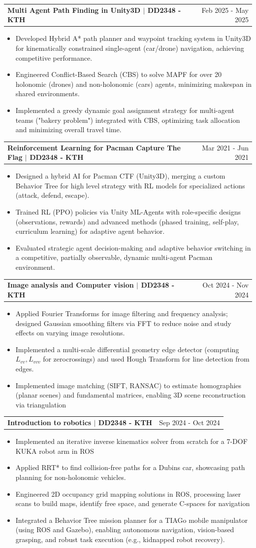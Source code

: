 \documentclass[letterpaper, 11pt]{article}
\makeatletter
\newcommand{\resumeItem}[1]{ \item\small{ {#1 \vspace{-2pt}} } }
\newcommand{\resumeProjectHeading}[2]{
\vspace{-1pt}
\item
\begin{tabular*}{1.0\textwidth}[t]{l@{\extracolsep{\fill}}r}
	\textbf{#1}  & {\small #2} \\
\end{tabular*}
\vspace{-20pt}
}
\newcommand{\resumeItemListStart}{\begin{itemize}[leftmargin=0.25in]}
\newcommand{\resumeItemListEnd}{\end{itemize}
\vspace{-5pt}}
\makeatother
\begin{document}
    
    \resumeProjectHeading{Multi Agent Path Finding in Unity3D $|$ \textnormal{\small DD2348 - KTH}}{Feb 2025 - May 2025}
    \resumeItemListStart 
        \resumeItem{Developed Hybrid A* path planner and waypoint tracking system in Unity3D for kinematically constrained single-agent (car/drone) navigation, achieving competitive performance.}
        \resumeItem{Engineered Conflict-Based Search (CBS) to solve MAPF for over 20 holonomic (drones) and non-holonomic (cars) agents, minimizing makespan in shared environments. }
        \resumeItem{Implemented a greedy dynamic goal assignment strategy for multi-agent teams ("bakery problem") integrated with CBS, optimizing task allocation and minimizing overall travel time. }
    \resumeItemListEnd

    \newpage 
    \resumeProjectHeading{Reinforcement Learning for Pacman Capture The Flag $|$ \textnormal{\small DD2348 - KTH}}{Mar 2021 - Jun 2021}
    \resumeItemListStart 
        \resumeItem{Designed a hybrid AI for Pacman CTF (Unity3D), merging a custom Behavior Tree for high level strategy with RL models for specialized actions (attack, defend, escape).}
        \resumeItem{Trained RL (PPO) policies via Unity ML-Agents with role-specific designs (observations, rewards) and advanced methods (phased training, self-play, curriculum learning) for adaptive agent behavior.}
        \resumeItem{Evaluated strategic agent decision-making and adaptive behavior switching in a competitive, partially observable, dynamic multi-agent Pacman environment.}
    \resumeItemListEnd

    \resumeProjectHeading{Image analysis and Computer vision $|$ \textnormal{\small DD2348 - KTH}}{Oct 2024 - Nov 2024}
    \resumeItemListStart 
        \resumeItem{Applied Fourier Transforms for image filtering and frequency analysis; designed Gaussian smoothing filters via FFT to reduce noise and study effects on varying image resolutions.}
        \resumeItem{Implemented a multi-scale differential geometry edge detector (computing $L_{vv}, L_{vvv}$ for zero\-crossings)
        and used Hough Transform for line detection from edges.}
        \resumeItem{Implemented image matching (SIFT, RANSAC) to estimate homographies (planar scenes) and fundamental matrices, enabling 3D scene reconstruction via triangulation}  
    \resumeItemListEnd

    \resumeProjectHeading{Introduction to robotics $|$ \textnormal{\small DD2348 - KTH}}{Sep 2024 - Oct 2024}
    \resumeItemListStart 
        \resumeItem{Implemented an iterative inverse kinematics solver from scratch for a 7-DOF KUKA robot arm in ROS}
        \resumeItem{Applied RRT* to find collision-free paths for a Dubins car, showcasing path planning for non-holonomic vehicles.}
        \resumeItem{Engineered 2D occupancy grid mapping solutions in ROS, processing laser scans to build maps, identify free space, and generate C-spaces for navigation}  
        \resumeItem{Integrated a Behavior Tree mission planner for a TIAGo mobile manipulator (using ROS and Gazebo), enabling autonomous navigation, vision-based grasping, and robust task execution (e.g., kidnapped robot recovery).}
    \resumeItemListEnd
    
\end{document}
